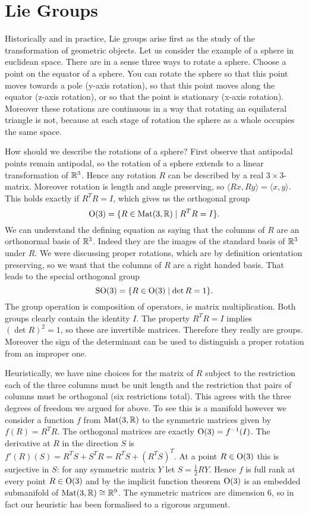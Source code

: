 \section{Lie Groups}

Historically and in practice, Lie groups arise first as the study of the transformation of geometric objects.
Let us consider the example of a sphere in euclidean space.
There are in a sense three ways to rotate a sphere.
Choose a point on the equator of a sphere.
You can rotate the sphere so that this point moves towards a pole (y-axis rotation), so that this point moves along the equator (z-axis rotation), or so that the point is stationary (x-axis rotation).
Moreover these rotations are continuous in a way that rotating an equilateral triangle is not, because at each stage of rotation the sphere as a whole occupies the same space.

How should we describe the rotations of a sphere?
First observe that antipodal points remain antipodal, so the rotation of a sphere extends to a linear transformation of $\mathbb{R}^3$.
Hence any rotation $R$ can be described by a real $3\times 3$-matrix.
Moreover rotation is length and angle preserving, so $\langle Rx, Ry \rangle = \langle x, y \rangle$.
This holds exactly if $R^TR = I$, which gives us the orthogonal group
\[
\mathrm{O}(3) = \{ R \in \operatorname{Mat}(3,\mathbb{R}) \mid R^TR = I \}.
\]
We can understand the defining equation as saying that the columns of $R$ are an orthonormal basis of $\mathbb{R}^3$.
Indeed they are the images of the standard basis of $\mathbb{R}^3$ under $R$.
We were discussing proper rotations, which are by definition orientation preserving, so we want that the columns of $R$ are a right handed basis.
That leads to the special orthogonal group
\[
\mathrm{SO}(3) = \{ R \in \mathrm{O}(3) \mid \det R = 1 \}.
\]
The group operation is composition of operators, ie matrix multiplication.
Both groups clearly contain the identity $I$.
The property $R^T R = I$ implies $(\det R)^2 = 1$, so these are invertible matrices.
Therefore they really are groups.
Moreover the sign of the determinant can be used to distinguish a proper rotation from an improper one.

Heuristically, we have nine choices for the matrix of $R$ subject to the restriction each of the three columns must be unit length and the restriction that pairs of columns must be orthogonal (six restrictions total).
This agrees with the three degrees of freedom we argued for above.
To see this is a manifold however we consider a function $f$ from $\operatorname{Mat}(3,\mathbb{R})$ to the symmetric matrices given by $f(R) = R^TR$.
The orthogonal matrices are exactly $\mathrm{O}(3) = f^{-1}(I)$.
The derivative at $R$ in the direction $S$ is $f'(R)(S) = R^TS + S^T R = R^T S + (R^T S)^T$.
At a point $R \in \mathrm{O}(3)$ this is surjective in $S$: for any symmetric matrix $Y$ let $S = \frac{1}{2}RY$.
Hence $f$ is full rank at every point $R \in \mathrm{O}(3)$ and by the implicit function theorem $\mathrm{O}(3)$ is an embedded submanifold of $\operatorname{Mat}(3,\mathbb{R}) \cong \mathbb{R}^9$.
The symmetric matrices are dimension $6$, so in fact our heuristic has been formalised to a rigorous argument.

